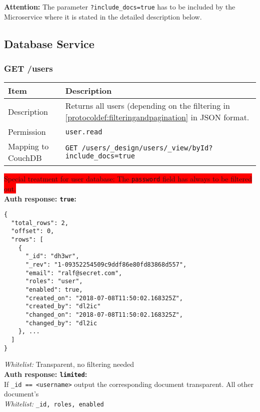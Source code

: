 \textbf{Attention:} The parameter \verb|?include_docs=true| has to be included by the Microservice where it is stated in the detailed description below.\\

\newpage
\subsection{Database Service}
\subsubsection{GET /users}
\label{protocoldef:microservicesapi:database:getusers}

\begin{table}[htbp]
  \begin{tabular}{|l|p{12cm}|} \hline
    Item               & Description  \\ \hline \hline
    Description        & Returns all users (depending on the filtering in \ref{protocoldef:filteringandpagination} in JSON format. \\ \hline
    Permission         & \verb|user.read| \\ \hline
    Mapping to CouchDB & \verb|GET /users/_design/users/_view/byId?include_docs=true|\\ \hline
  \end{tabular}
\end{table}

\colorbox{red}{Special treatment for user database: The \texttt{password} field has always to be filtered out.}\\

\textbf{Auth response: \texttt{true}:}

\begin{lstlisting}
{
  "total_rows": 2,
  "offset": 0,
  "rows": [
    {
      "_id": "dh3wr",
      "_rev": "1-09352254509c9ddf86e80fd83868d557",
      "email": "ralf@secret.com",
      "roles": "user",
      "enabled": true,
      "created_on": "2018-07-08T11:50:02.168325Z",
      "created_by": "dl2ic"
      "changed_on": "2018-07-08T11:50:02.168325Z",
      "changed_by": "dl2ic
    }, ...
  ]
}
\end{lstlisting}
\textit{Whitelist:} Transparent, no filtering needed\\

\textbf{Auth response: \texttt{limited}:}\\
If \verb|_id == <username>| output the corresponding document transparent. All other document's\\
\textit{Whitelist:} \verb|_id, roles, enabled|

